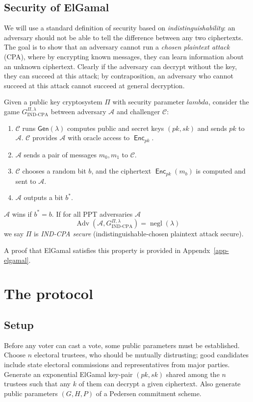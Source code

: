 \documentclass[11pt,twoside,a4paper]{article}
\DeclareMathOperator{\negl}{\text{negl}}
\DeclareMathOperator{\Adv}{\text{Adv}}
\DeclareMathOperator{\Enc}{\mathsf{Enc}}
\theoremstyle{definition}
\begin{document}
\subsection{Security of ElGamal}
We will use a standard definition of security based on \textit{indistinguishability}: an adversary should not be able to tell the difference between any two ciphertexts. The goal is to show that an adversary cannot run a \textit{chosen plaintext attack} (CPA), where by encrypting known messages, they can learn information about an unknown ciphertext. Clearly if the adversary can decrypt without the key, they can succeed at this attack; by contraposition, an adversary who cannot succeed at this attack cannot succeed at general decryption.

\begin{definition}
    Given a public key cryptosystem $\Pi$ with security parameter $lambda$, consider the game $G_{\text{IND-CPA}}^{\Pi,\lambda}$ between adversary $\mathcal{A}$ and challenger $\mathcal{C}$:
    \begin{enumerate}
        \item $\mathcal{C}$ runs $\mathsf{Gen}(\lambda)$ computes public and secret keys $(pk, sk)$ and sends $pk$ to $\mathcal{A}$. $\mathcal{C}$ provides $\mathcal{A}$ with oracle access to $\Enc_{pk}$.
        \item $\mathcal{A}$ sends a pair of messages $m_0, m_1$ to $\mathcal{C}$.
        \item $\mathcal{C}$ chooses a random bit $b$, and the ciphertext $\Enc_{pk}(m_b)$ is computed and sent to $\mathcal{A}$.
        \item $\mathcal{A}$ outputs a bit $b^*$.
    \end{enumerate}
    $\mathcal{A}$ wins if $b^*=b$. If for all PPT adversaries $\mathcal{A}$
    $$\Adv\left(\mathcal{A},G^{\Pi,\lambda}_{\text{IND-CPA}}\right)=\negl(\lambda)$$
    we say $\Pi$ is \textit{IND-CPA secure} (indistinguishable-chosen plaintext attack secure).
\end{definition}
A proof that ElGamal satisfies this property is provided in Appendx~\ref{app-elgamal}.
\section{The protocol}\label{sec-protocol}
\subsection{Setup}
Before any voter can cast a vote, some public parameters must be established. Choose $n$ electoral trustees, who should be mutually distrusting; good candidates include state electoral commissions and representatives from major parties. Generate an exponential ElGamal key-pair $(pk, sk)$ shared among the $n$ trustees such that any $k$ of them can decrypt a given ciphertext. Also generate public parameters $(G, H, P)$ of a Pedersen commitment scheme.
\end{document}

